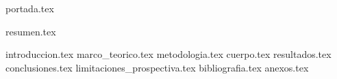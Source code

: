 \documentclass[a4paper,openany,oneside,12pt]{report}
\begin{document}
  {portada.tex}
  \setcounter{page}{2} %

  {resumen.tex}

  \clearpage
  \tableofcontents
  \clearpage
  \listoffigures 
  \clearpage
  \listoftables 

  {introduccion.tex}
  {marco_teorico.tex}
  {metodologia.tex}
  {cuerpo.tex}
  {resultados.tex}
  {conclusiones.tex}
  {limitaciones_prospectiva.tex}
  {bibliografia.tex}
  {anexos.tex}
\end{document}
